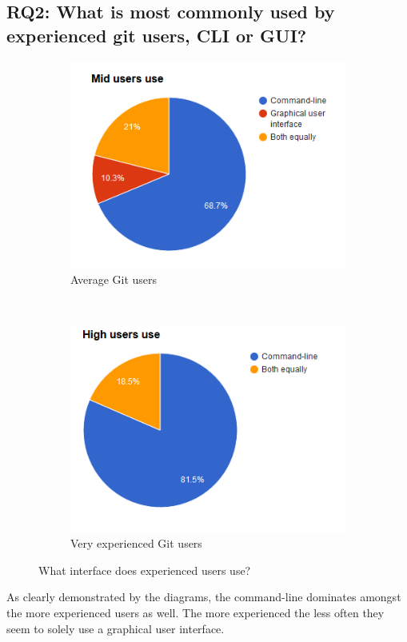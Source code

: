\documentclass[a4paper,oneside]{bth} %
\begin{document}
		\subsection{RQ2: What is most commonly used by experienced git users, CLI or GUI?}
		\begin{figure}[H]
			\centering
			\begin{subfigure}[b]{0.45\textwidth}
				\includegraphics[width=\textwidth]{graphs/mid-users-use.png}
				\caption{Average Git users}
				\label{fig:Mid users use}
			\end{subfigure}
			~
			\begin{subfigure}[b]{0.45\textwidth}
				\includegraphics[width=\textwidth]{graphs/high-users-use.png}
				\caption{Very experienced Git users}
				\label{fig:High users use}
			\end{subfigure}
			\caption{What interface does experienced users use?}\label{fig:q1-q2}
		\end{figure}
		As clearly demonstrated by the diagrams, the command-line dominates amongst the more experienced users as well. The more experienced the less often they seem to solely use a graphical user interface.
		
\end{document}
